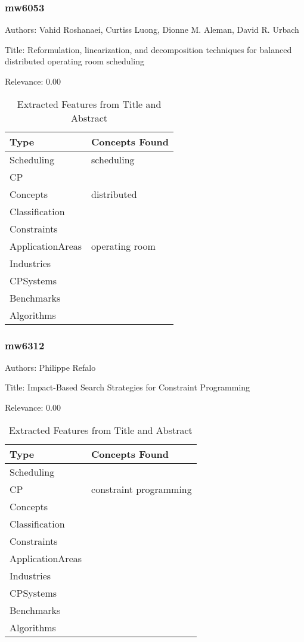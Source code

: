 \subsubsection{mw6053}
\label{mw:mw6053}

Authors: Vahid Roshanaei, Curtiss Luong, Dionne M. Aleman, David R. Urbach

Title: Reformulation, linearization, and decomposition techniques for balanced distributed operating room scheduling

Relevance:  0.00

{\scriptsize
\begin{longtable}{p{2cm}p{20cm}}
\caption{Extracted Features from Title and Abstract}\\ \toprule
Type & Concepts Found\\ \midrule
\endhead
\bottomrule
\endfoot
Scheduling & scheduling\\ 
CP & \\ 
Concepts & distributed\\ 
Classification & \\ 
Constraints & \\ 
ApplicationAreas & operating room\\ 
Industries & \\ 
CPSystems & \\ 
Benchmarks & \\ 
Algorithms & \\ 
\end{longtable}
}



\subsubsection{mw6312}
\label{mw:mw6312}

Authors: Philippe Refalo

Title: Impact-Based Search Strategies for Constraint Programming

Relevance:  0.00

{\scriptsize
\begin{longtable}{p{2cm}p{20cm}}
\caption{Extracted Features from Title and Abstract}\\ \toprule
Type & Concepts Found\\ \midrule
\endhead
\bottomrule
\endfoot
Scheduling & \\ 
CP & constraint programming\\ 
Concepts & \\ 
Classification & \\ 
Constraints & \\ 
ApplicationAreas & \\ 
Industries & \\ 
CPSystems & \\ 
Benchmarks & \\ 
Algorithms & \\ 
\end{longtable}
}



